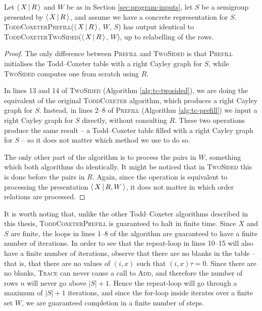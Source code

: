 \begin{theorem}
  Let $\left\langle \, X \, \middle| \, R \, \right\rangle$ and $W$ be as in Section \ref{sec:program-inputs}, let $S$ be a
  semigroup presented by $\left\langle \, X \, \middle| \, R \, \right\rangle$, and assume we have a concrete
  representation for $S$.
  \textsc{ToddCoxeterPrefill}($\left\langle \, X \, \middle| \, R \, \right\rangle$, $W$, $S$) has output identical to
  \textsc{ToddCoxeterTwoSided}($\left\langle \, X \, \middle| \, R \, \right\rangle$, $W$), up to relabelling of the rows.
  \begin{proof}
    The only difference between \textsc{Prefill} and \textsc{TwoSided} is that
    \textsc{Prefill} initialises the Todd--Coxeter table with a right Cayley
    graph for $S$, while \textsc{TwoSided} computes one from scratch using $R$.


    In lines 13 and 14 of \textsc{TwoSided} (Algorithm \ref{alg:tc-twosided}),
    we are doing the equivalent of the original \textsc{ToddCoxeter} algorithm,
    which produces a right Cayley graph for $S$.  Instead, in lines 2--8 of
    \textsc{Prefill} (Algorithm \ref{alg:tc-prefill}) we input a right Cayley
    graph for $S$ directly, without consulting $R$.  These two operations
    produce the same result -- a Todd--Coxeter table filled with a right Cayley
    graph for $S$ -- so it does not matter which method we use to do so.

    The only other part of the algorithm is to process the pairs in $W$,
    something which both algorithms do identically.  It might be noticed that in
    \textsc{TwoSided} this is done before the pairs in $R$.  Again, since the
    operation is equivalent to processing the presentation $\left\langle \, X \, \middle| \, R,W \, \right\rangle$, it
    does not matter in which order relations are processed.
  \end{proof}
\end{theorem}

It is worth noting that, unlike the other Todd--Coxeter algorithms described in
this thesis, \textsc{ToddCoxeterPrefill} is guaranteed to halt in finite time.
Since $X$ and $S$ are finite, the loops in lines 1--8 of the algorithm are
guaranteed to have a finite number of iterations.  In order to see that the
repeat-loop in lines 10--15 will also have a finite number of iterations,
observe that there are no blanks in the table -- that is, that there are no
values of $(i,x)$ such that $(i,x)\tau = 0$.  Since there are no blanks,
\textsc{Trace} can never cause a call to \textsc{Add}, and therefore the number
of rows $n$ will never go above $|S|+1$.  Hence the repeat-loop will go through
a maximum of $|S| + 1$ iterations, and since the for-loop inside iterates over a
finite set $W$, we are guaranteed completion in a finite number of steps.

